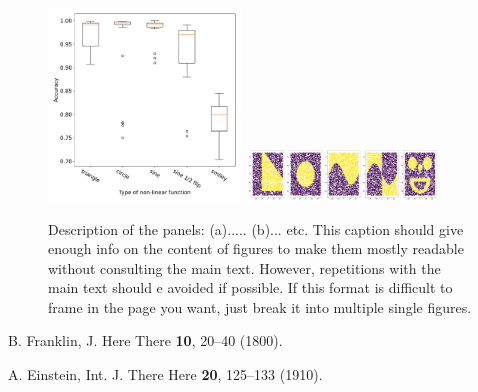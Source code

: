 \documentclass[prl,twocolumn]{revtex4-1}
\begin{document}
\begin{figure}[!tb]
  \vskip 0.5mm
  \includegraphics[width=0.455\textwidth]{task_1/figures/types_box_30.pdf} \hskip 0.5mm
  \includegraphics[width = 0.455\textwidth]{task_1/figures/non_linear_functions.pdf}
  \caption{Description of the panels: (a)..... (b)... etc. This caption should give enough info on the content of figures to make them mostly readable without consulting the main text. However, repetitions with the main text should e avoided if possible. {\color{red} If this format is difficult to frame in the page you want, just break it into multiple single figures.}}
  \label{fig:x}
\end{figure}



\begin{thebibliography}{99}

  B. Franklin,
  J. Here There {\bf 10}, 20--40 (1800).
  
  A. Einstein,
  Int. J. There Here {\bf 20}, 125--133 (1910).
  
\end{thebibliography}

\clearpage

\end{document}

